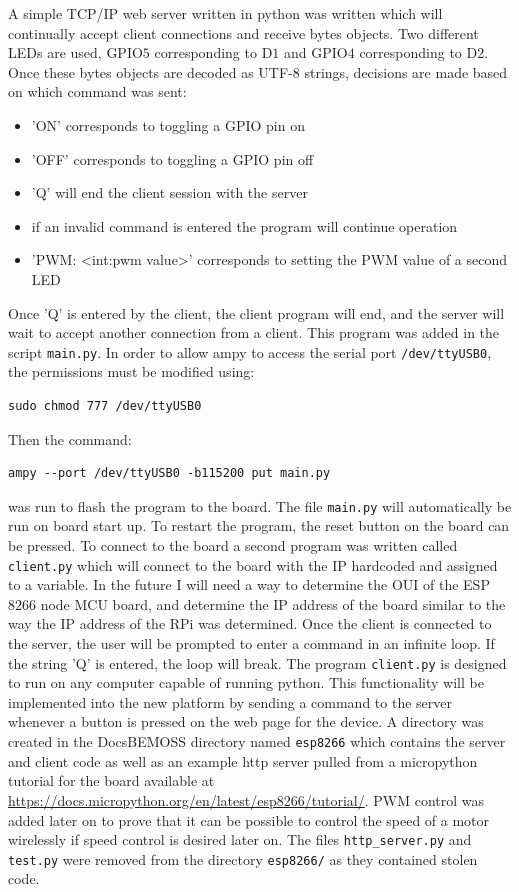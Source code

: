 \documentclass[fontsize=11pt, %
                             paper=letter, %
                             twoside, %
                             captions=tableheading,
                             index=totoc,
                             hyperref]{labbook}
\begin{document}
\begin{addmargin}[0cm]{0cm}
A simple TCP/IP web server written in python was written which will continually accept client connections and receive bytes objects. Two different LEDs are used, GPIO$5$ corresponding to D$1$ and GPIO$4$ corresponding to D$2$. Once these bytes objects are decoded as UTF-$8$ strings, decisions are made based on which command was sent:
\begin{itemize}
\item 'ON' corresponds to toggling a GPIO pin on
\item 'OFF' corresponds to toggling a GPIO pin off
\item 'Q' will end the client session with the server
\item if an invalid command is entered the program will continue operation
\item 'PWM: <int:pwm value>' corresponds to setting the PWM value of a second LED
\end{itemize}
Once 'Q' is entered by the client, the client program will end, and the server will wait to accept another connection from a client. This program was added in the script \texttt{main.py}. In order to allow ampy to access the serial port \texttt{/dev/ttyUSB0}, the permissions must be modified using:
\begin{Verbatim}
sudo chmod 777 /dev/ttyUSB0
\end{Verbatim}
Then the command:
\begin{Verbatim}
ampy --port /dev/ttyUSB0 -b115200 put main.py
\end{Verbatim}
was run to flash the program to the board.
\smallbreak\noindent
The file \texttt{main.py} will automatically be run on board start up. To restart the program, the reset button on the board can be pressed. 
\smallbreak\noindent
To connect to the board a second program was written called \texttt{client.py} which will connect to the board with the IP hardcoded and assigned to a variable. In the future I will need a way to determine the OUI of the ESP$8266$ node MCU board, and determine the IP address of the board similar to the way the IP address of the RPi was determined. Once the client is connected to the server, the user will be prompted to enter a command in an infinite loop. If the string 'Q' is entered, the loop will break. The program \texttt{client.py} is designed to run on any computer capable of running python. This functionality will be implemented into the new platform by sending a command to the server whenever a button is pressed on the web page for the device.
\smallbreak\noindent
A directory was created in the DocsBEMOSS directory named \texttt{esp8266} which contains the server and client code as well as an example http server pulled from a micropython tutorial for the board available at \url{https://docs.micropython.org/en/latest/esp8266/tutorial/}.
\smallbreak\noindent
PWM control was added later on to prove that it can be possible to control the speed of a motor wirelessly if speed control is desired later on.
\smallbreak\noindent
The files \texttt{http\_server.py} and \texttt{test.py} were removed from the directory \texttt{esp8266/} as they contained stolen code.


\end{addmargin}
\end{document}
